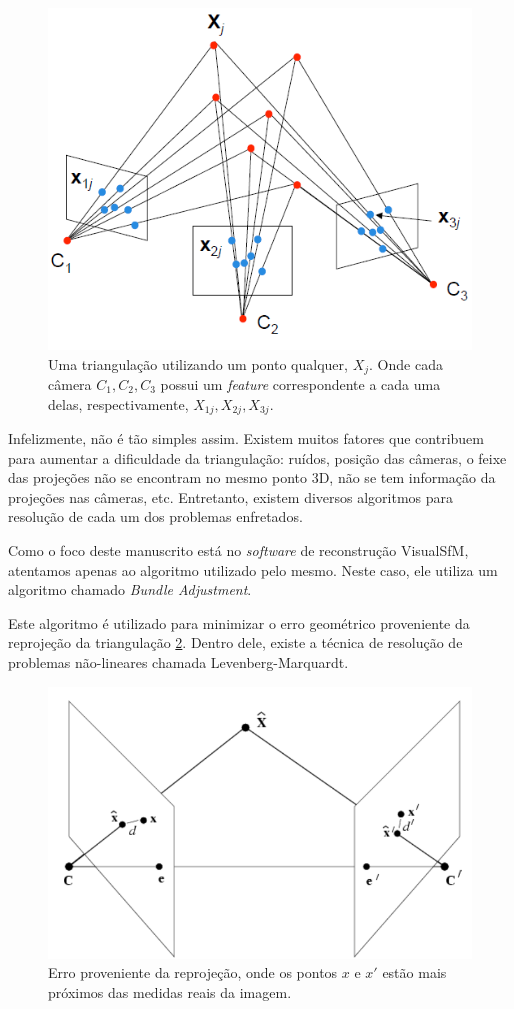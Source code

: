 \begin{figure} [!h]
	\centering
	\includegraphics[width=0.45\linewidth]{figs/triangulacao.png}
	\caption{%
	Uma triangulação utilizando um ponto qualquer, $X_j$. Onde cada câmera $C_1, C_2, C_3$ possui um {\it feature} correspondente a cada uma delas, respectivamente, $X_{1j}, X_{2j}, X_{3j}$.
	}\label{fig:triangulacao}
\end{figure}

Infelizmente, não é tão simples assim. Existem muitos fatores que contribuem para aumentar a dificuldade da triangulação: ruídos, posição das câmeras, o feixe das projeções não se encontram no mesmo ponto 3D, não se tem informação da projeções nas câmeras, etc. Entretanto, existem diversos algoritmos para resolução de cada um dos problemas enfretados.

Como o foco deste manuscrito está no {\it software} de reconstrução VisualSfM, atentamos apenas ao algoritmo utilizado pelo mesmo. Neste caso, ele utiliza um algoritmo chamado {\it Bundle Adjustment}. 

Este algoritmo é utilizado para minimizar o erro geométrico proveniente da reprojeção da triangulação \ref{fig:triangulacaoErro}. Dentro dele, existe a técnica de resolução de problemas não-lineares chamada Levenberg-Marquardt.

\begin{figure} [!h]
	\centering
	\includegraphics[width=0.45\linewidth]{figs/triangulacaoErro.png}
	\caption{%
	Erro proveniente da reprojeção, onde os pontos $x$ e $x'$ estão mais próximos das medidas reais da imagem. 
	}\label{fig:triangulacaoErro}
\end{figure}


